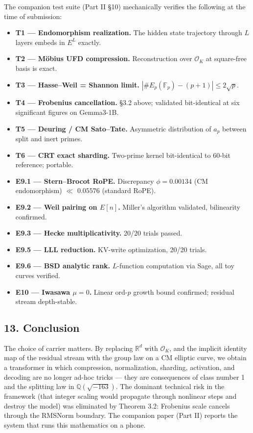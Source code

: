 \documentclass[
  11pt,
]{article}
\providecommand{\tightlist}{%
  \setlength{\itemsep}{0pt}\setlength{\parskip}{0pt}}
\begin{document}
The companion test suite (Part II §10) mechanically verifies the
following at the time of submission:

\begin{itemize}
\tightlist
\item
  \textbf{T1 --- Endomorphism realization.} The hidden state trajectory
  through \(L\) layers embeds in \(E^L\) exactly.
\item
  \textbf{T2 --- Möbius UFD compression.} Reconstruction over
  \(\mathcal{O}_K\) at square-free basis is exact.
\item
  \textbf{T3 --- Hasse--Weil = Shannon limit.}
  \(|\#E_p(\mathbb{F}_p) - (p+1)| \le 2\sqrt p\).
\item
  \textbf{T4 --- Frobenius cancellation.} §3.2 above; validated
  bit-identical at six significant figures on Gemma3-1B.
\item
  \textbf{T5 --- Deuring / CM Sato--Tate.} Asymmetric distribution of
  \(a_p\) between split and inert primes.
\item
  \textbf{T6 --- CRT exact sharding.} Two-prime kernel bit-identical to
  60-bit reference; portable.
\item
  \textbf{E9.1 --- Stern--Brocot RoPE.} Discrepancy \(\phi=0.00134\) (CM
  endomorphism) \(\ll\) \(0.05576\) (standard RoPE).
\item
  \textbf{E9.2 --- Weil pairing on \(E[n]\).} Miller's algorithm
  validated, bilinearity confirmed.
\item
  \textbf{E9.3 --- Hecke multiplicativity.} 20/20 trials passed.
\item
  \textbf{E9.5 --- LLL reduction.} KV-write optimization, 20/20 trials.
\item
  \textbf{E9.6 --- BSD analytic rank.} \(L\)-function computation via
  Sage, all toy curves verified.
\item
  \textbf{E10 --- Iwasawa \(\mu = 0\).} Linear ord-\(p\) growth bound
  confirmed; residual stream depth-stable.
\end{itemize}

\hypertarget{conclusion}{%
\subsection{13. Conclusion}\label{conclusion}}

The choice of carrier matters. By replacing \(\mathbb{R}^d\) with
\(\mathcal{O}_K\), and the implicit identity map of the residual stream
with the group law on a CM elliptic curve, we obtain a transformer in
which compression, normalization, sharding, activation, and decoding are
no longer ad-hoc tricks --- they are consequences of class number 1 and
the splitting law in \(\mathbb{Q}(\sqrt{-163})\). The dominant technical
risk in the framework (that integer scaling would propagate through
nonlinear steps and destroy the model) was eliminated by Theorem 3.2:
Frobenius scale cancels through the RMSNorm boundary. The companion
paper (Part II) reports the system that runs this mathematics on a
phone.
\end{document}
